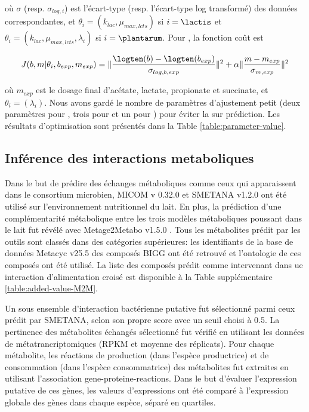 \documentclass[../main.tex]{subfiles}
\begin{document}
où $\sigma$ (resp. $\sigma_{log,i}$) est l'écart-type (resp. l'écart-type log transformé) des données correspondantes, et $\theta_i = (k_{lac},\mu_{max,lcts})$ si $i=\lactis$ et $\theta_i = (k_{lac},\mu_{max,lcts},\lambda_i)$ si $i=\plantarum$.
Pour \freud, la fonction coût est 

\begin{equation} 
J(b,m | \theta_i, b_{exp},m_{exp} ) = \| \frac{\logten(b) - \logten(b_{exp})}{\sigma_{log,b,exp}} \|^2 + \alpha \|\frac{m - m_{exp}}{\sigma_{m,exp}} \|^2 
\label{eq:optim_freud}
\end{equation}

où $m_{exp}$ est le dosage final d'acétate, lactate, propionate et succinate, et $\theta_i = (\lambda_i)$. Nous avons gardé le nombre de paramètres d'ajustement petit (deux paramètres pour \lactis, trois pour \plantarum et un pour \freud) pour éviter la sur prédiction. Les résultats d'optimisation sont présentés dans la Table \ref{table:parameter-value}.

\subsection{Inférence des interactions metaboliques}

Dans le but de prédire des échanges métaboliques comme ceux qui apparaissent dans le consortium microbien, MICOM v 0.32.0 \citep{diener2020} et SMETANA v1.2.0 \citep{Zelezniak2015} ont été utilisé sur l'environnement nutritionnel du lait. En plus, la prédiction d'une complémentarité métabolique entre les trois modèles métaboliques poussant dans le lait fut révélé avec Metage2Metabo v1.5.0 \citep{Belcour.2020}. Tous les métabolites prédit par les outils sont classés dans des catégories supérieures: les identifiants de la base de données Metacyc v25.5 \citep{Caspi2018} des composés BIGG ont été retrouvé et l'ontologie de ces composés ont été utilisé. La liste des composés prédit comme intervenant dans ue interaction d'alimentation croisé est disponible à la Table supplémentaire \ref{table:added-value-M2M}.

Un sous ensemble d'interaction bactérienne putative fut sélectionné parmi ceux prédit par SMETANA, selon son propre score avec un seuil choisi à 0.5. La pertinence des métabolites échangés sélectionné  fut vérifié en utilisant les données de métatrancriptomiques (RPKM et moyenne des réplicats). Pour chaque métabolite, les réactions de production (dans l'espèce productrice) et de consommation (dans l'espèce consommatrice) des métabolites fut extraites en utilisant l'association gene-proteine-reactions. Dans le but d'évaluer l'expression putative de ces gènes, les valeurs d'expressions ont été comparé à l'expression globale des gènes dans chaque espèce, séparé en quartiles.
\end{document}
